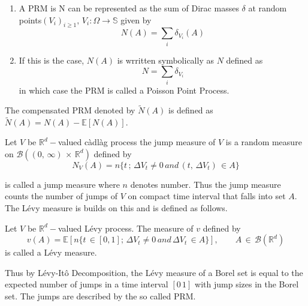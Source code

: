 \begin{remark}
\begin{enumerate}
    \item A PRM is N can be represented as the sum of Dirac masses $\delta$ at random points$(V_i)_{i\geq1}, \, V_i: \Omega \to \mathbb{S}$ given by $$N(A) = \sum_i \delta_{V_i}(A)$$
    \item If this is the case, $N(A)$ is wrritten symbolically as $N$ defined as $$N = \sum_i \delta_{V_i}$$ in which case the PRM is called a Poisson Point Process.
\end{enumerate}
\end{remark}
\begin{definition}
The compensated PRM denoted by $\tilde{N}(A)$ is defined as $\tilde{N}(A) = N(A) - \mathbb{E}[N(A)].$
\end{definition}
\begin{definition}
Let $V$ be  $\mathbb{R}^d-$valued c\`adl\`ag process the jump measure of $V$ is a random measure on $\mathcal{B}((0, \, \infty) \, \times \, \mathbb{R}^d)$ defined by 
\begin{equation}
    N_V(A) = n\{t \, ; \, \Delta V_t \neq 0 \, and  \, (t, \, \Delta V_t) \, \in A \}
\end{equation}
\end{definition}
is called a jump measure where $n$ denotes number. Thus the jump measure counts the number of jumps of $V$ on compact time interval that falls into set $A$. The L\'evy measure is builds on this and is defined as follows.
\begin{definition}
Let $V$ be  $\mathbb{R}^d-$valued L\'evy process. The measure of $v$  defined by 
\begin{equation}
    v(A) = \mathbb{E}[n \{t \, \in [0, 1]; \, \Delta V_t \neq 0 \, and  \, \Delta V_t \, \in A \}], \qquad A \, \in \, \mathcal{B}(\mathbb{R}^d)
\end{equation}
is called a L\'evy measure.
\end{definition}
Thus by L\'evy-It\^o Decomposition, the L\'evy measure of a Borel set is equal to the expected number of jumps in a time interval $[0\, 1]$ with jump sizes in the Borel set. The jumps are described by the so called PRM.\\

